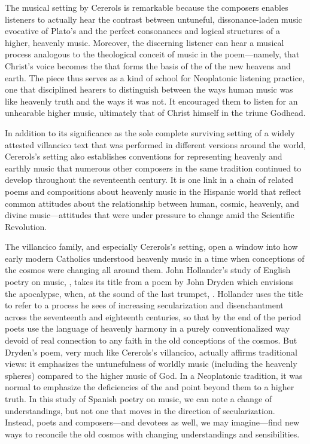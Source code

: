 The musical setting by Cererols is remarkable because the composers enables
listeners to actually hear the contrast between untuneful, dissonance-laden
music evocative of Plato's  and the perfect
consonances and logical structures of a higher, heavenly music.
Moreover, the discerning listener can hear a musical process analogous to the
theological conceit of music in the poem---namely, that Christ's voice becomes
the  that forms the basis of the  of the
new heavens and earth.
The piece thus serves as a kind of school for Neoplatonic listening practice,
one that disciplined hearers to distinguish between the ways human music was
like heavenly truth and the ways it was not.
It encouraged them to listen for an unhearable higher music, ultimately that of
Christ himself in the triune Godhead.

In addition to its significance as the sole complete surviving setting of a
widely attested villancico text that was performed in different versions around
the world, Cererols's setting also establishes conventions for representing
heavenly and earthly music that numerous other composers in the same tradition
continued to develop throughout the seventeenth century. 
It is one link in a chain of related poems and compositions about heavenly music
in the Hispanic world that reflect common attitudes about the relationship
between human, cosmic, heavenly, and divine music---attitudes that were under
pressure to change amid the Scientific Revolution.

The villancico family, and especially Cererols's setting, open a window into how
early modern Catholics understood heavenly music in a time when conceptions of
the cosmos were changing all around them.
John Hollander's study of English poetry on music, , takes its title from a poem by John Dryden which envisions the apocalypse,
when, at the sound of the last trumpet, .
Hollander uses the title to refer to a process he sees of increasing
secularization and disenchantment across the seventeenth and eighteenth
centuries, so that by the end of the period poets use the language of heavenly
harmony in a purely conventionalized way devoid of real connection to any faith
in the old conceptions of the cosmos.
But Dryden's poem, very much like Cererols's villancico, actually affirms
traditional views: it emphasizes the untunefulness of worldly music (including
the heavenly spheres) compared to the higher music of God.
In a Neoplatonic tradition, it was normal to emphasize the deficiencies of the
 and point beyond them to a higher truth.
In this study of Spanish poetry on music, we can note a change of
understandings, but not one that moves in the direction of secularization.
Instead, poets and composers---and devotees as well, we may imagine---find new
ways to reconcile the old cosmos with changing understandings and sensibilities.

